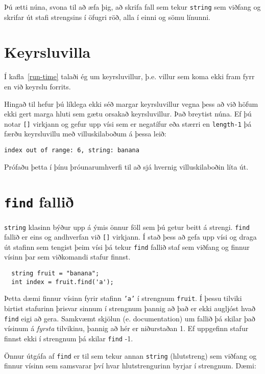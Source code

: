 Þú ætti núna, svona til að æfa þig, að skrifa fall sem tekur {\tt string} sem viðfang og skrifar út stafi strengsins í öfugri röð, alla í einni og sömu línunni.

\section{Keyrsluvilla}

Í kafla~\ref{run-time} talaði ég um keyrsluvillur, þ.e. villur sem koma ekki fram fyrr en við keyrslu forrits.

Hingað til hefur þú líklega ekki séð margar keyrsluvillur vegna þess að við höfum ekki gert marga hluti sem gætu orsakað keyrsluvillur.
Það breytist núna.
Ef þú notar {\tt []} virkjann og gefur upp vísi sem er negatífur eða stærri en {\tt length-1} þá færðu keyrsluvillu með villuskilaboðum á þessa leið:

\begin{verbatim}
index out of range: 6, string: banana
\end{verbatim}
%
Prófaðu þetta í þínu þróunarumhverfi til að sjá hvernig villuskilaboðin líta út.

\section{{\tt find} fallið}

{\tt string} klasinn býður upp á ýmis önnur föll sem þú getur beitt á strengi.
{\tt find} fallið er eins og andhverfan við {\tt []} virkjann.
Í stað þess að gefa upp vísi og draga út stafinn sem tengist þeim vísi þá tekur {\tt find} fallið staf sem viðfang
og finnur vísinn þar sem viðkomandi stafur finnst.

\begin{verbatim}
  string fruit = "banana";
  int index = fruit.find('a');
\end{verbatim}
%
Þetta dæmi finnur vísinn fyrir stafinn {\tt 'a'} í strengnum {\tt fruit}.
Í þessu tilviki birtist stafurinn þrisvar sinnum í strengnum þannig að það er ekki augljóst hvað {\tt find} eigi að gera.
Samkvæmt skjölun (e. documentation) um fallið þá skilar það vísinum á {\em fyrsta} tilvikinu, þannig að hér er niðurstaðan 1.
Ef uppgefinn stafur finnst ekki í strengnum þá skilar {\tt find} -1.

Önnur útgáfa af {\tt find} er til sem tekur annan {\tt string} (hlutstreng) sem viðfang og finnur vísinn sem samsvarar því hvar hlutstrengurinn byrjar í strengnum.
Dæmi:

